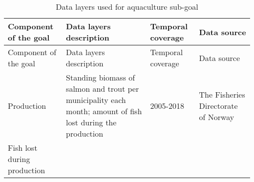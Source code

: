 \documentclass[
]{book}
\begin{document}
\begin{longtable}[]{@{}llll@{}}
\caption{\label{tab:layers} Data layers used for aquaculture sub-goal}\tabularnewline
\toprule
\begin{minipage}[b]{0.23\columnwidth}\raggedright
Component of the goal\strut
\end{minipage} & \begin{minipage}[b]{0.22\columnwidth}\raggedright
Data layers description\strut
\end{minipage} & \begin{minipage}[b]{0.25\columnwidth}\raggedright
Temporal coverage\strut
\end{minipage} & \begin{minipage}[b]{0.18\columnwidth}\raggedright
Data source\strut
\end{minipage}\tabularnewline
\midrule
\endfirsthead
\toprule
\begin{minipage}[b]{0.23\columnwidth}\raggedright
Component of the goal\strut
\end{minipage} & \begin{minipage}[b]{0.22\columnwidth}\raggedright
Data layers description\strut
\end{minipage} & \begin{minipage}[b]{0.25\columnwidth}\raggedright
Temporal coverage\strut
\end{minipage} & \begin{minipage}[b]{0.18\columnwidth}\raggedright
Data source\strut
\end{minipage}\tabularnewline
\midrule
\endhead
\begin{minipage}[t]{0.23\columnwidth}\raggedright
Production\strut
\end{minipage} & \begin{minipage}[t]{0.22\columnwidth}\raggedright
Standing biomass of salmon and trout per municipality each month; amount of fish lost during the production\strut
\end{minipage} & \begin{minipage}[t]{0.25\columnwidth}\raggedright
2005-2018\strut
\end{minipage} & \begin{minipage}[t]{0.18\columnwidth}\raggedright
The Fisheries Directorate of Norway\strut
\end{minipage}\tabularnewline
\begin{minipage}[t]{0.23\columnwidth}\raggedright
Fish lost during production\strut
\end{minipage} & \begin{minipage}[t]{0.22\columnwidth}\raggedright

\end{minipage}
\end{longtable}
\end{document}
